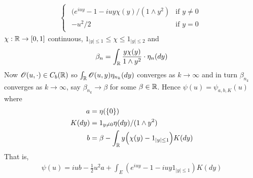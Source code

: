\documentclass[12pt,a4paper]{report}
\newenvironment{proof}
{\begin{changemargin}{1cm}{0.5cm} 
	}%
	{\end{changemargin}
}
\begin{document}
\begin{proof}
\begin{itemize}
\begin{align*}
\begin{cases}
\begin{array}{ll}
(e^{iuy}-1-iuy \chi(y)/(1\wedge y^2) & \text{if } y \neq 0\\
-u^2/2 & \text{if } y=0
\end{array}
\end{cases}
\end{align*}
$\chi : \mathbb{R} \rightarrow [0,1]$ continuous, $1_{|y|\leq 1} \leq  \chi \leq 1_{|y|\leq 2}$ and
\begin{align*}
\beta_n = \int_{\mathbb{R}} \frac{y \chi(y)}{1\wedge y^2} \cdot \eta_n (dy)
\end{align*}
Now $\mathscr{O}(u, \cdot) \in C_b(\mathbb{R})$ so $\int_{\mathbb{R}} \mathscr{O}(u,y) \eta_{n_k} (dy)$ converges as $k\rightarrow \infty $ and in turn $\beta_{n_k}$ converges as $k\rightarrow \infty$, say $\beta_{n_k} \rightarrow \beta$ for some $\beta \in \mathbb{R}$. Hence $\psi(u) = \psi_{a,b,K}(u)$ where
\begin{align*}
a &= \eta(\{0\}) \\
K(dy) &= 1_{y\neq 0} \eta(dy) / (1\wedge y^2) \\
b &= \beta - \int_{\mathbb{R}} y \Big( \chi(y) - 1_{|y|\leq 1} \Big) K(dy)
\end{align*}
That is,
\begin{align*}
\psi(u) = iub - \frac{1}{2}u^2a  + \int_E (e^{iuy} - 1 - iuy1_{|y|\leq 1}) K(dy)
\end{align*}
\end{itemize}

\eop
\end{proof}
\end{document}
